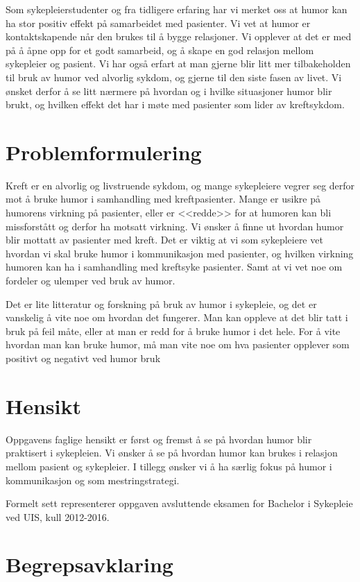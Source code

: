 Som sykepleierstudenter og fra tidligere erfaring har vi merket oss at humor
kan ha stor positiv effekt på samarbeidet med pasienter. Vi vet at humor er
kontaktskapende når den brukes til å bygge relasjoner. Vi opplever at det er
med på å åpne opp for et godt samarbeid, og å skape en god relasjon mellom
sykepleier og pasient. Vi har også erfart at man gjerne blir litt mer
tilbakeholden til bruk av humor ved alvorlig sykdom, og gjerne til den siste
fasen av livet. Vi ønsket derfor å se litt nærmere på hvordan og i hvilke
situasjoner humor blir brukt, og hvilken effekt det har i møte med pasienter
som lider av kreftsykdom.

\section{Problemformulering}

Kreft er en alvorlig og livstruende sykdom, og mange sykepleiere vegrer seg
derfor mot å bruke humor i samhandling med kreftpasienter. Mange er usikre på
humorens virkning på pasienter, eller er <<redde>> for at humoren kan bli
missforstått og derfor ha motsatt virkning. Vi ønsker å finne ut hvordan humor
blir mottatt av pasienter med kreft. Det er viktig at vi som sykepleiere vet
hvordan vi skal bruke humor i kommunikasjon med pasienter, og hvilken virkning
humoren kan ha i samhandling med kreftsyke pasienter. Samt at vi vet noe om
fordeler og ulemper ved bruk av humor.

Det er lite litteratur og forskning på bruk av humor i sykepleie, og det er
vanskelig å vite noe om hvordan det fungerer. Man kan oppleve at det blir tatt
i bruk på feil måte, eller at man er redd for å bruke humor i det hele. For å
vite hvordan man kan bruke humor, må man vite noe om hva pasienter opplever som
positivt og negativt ved humor bruk

\section{Hensikt}

Oppgavens faglige hensikt er først og fremst å se på hvordan humor blir
praktisert i sykepleien. Vi ønsker å se på hvordan humor kan brukes i relasjon
mellom pasient og sykepleier. I tillegg ønsker vi å ha særlig fokus på humor i
kommunikasjon og som mestringstrategi.

Formelt sett representerer oppgaven avsluttende eksamen for Bachelor i
Sykepleie ved UIS, kull 2012-2016.

\section{Begrepsavklaring}

